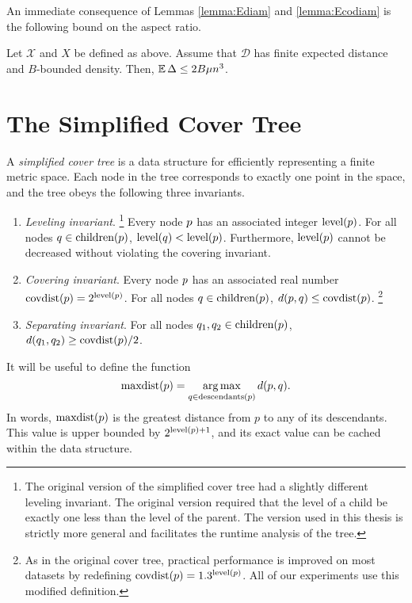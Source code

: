 \documentclass[../main.tex]{subfiles}
\newcommand{\set}[1]{\mathcal {#1}}
\newcommand{\distribution}[1]{\mathcal {#1}}
\newcommand{\dist}[2]{\distf({#1},{#2})}
\newcommand{\distf}{d}
\newcommand{\aspect}[1]{\Delta}
\newcommand{\p}{\ensuremath p}
\newcommand{\q}{\ensuremath q}
\newcommand{\mkfunction}[1]{\ifmmode{\text{{#1}}}}
\newcommand{\level}[1]      {\mkfunction{level}({#1})}
\newcommand{\children}[1]   {\mkfunction{children}({#1})}
\newcommand{\covdist}[1]    {\mkfunction{covdist}({#1})}
\newcommand{\descendants}[1]{\mkfunction{descendants}({#1})}
\newcommand{\maxdist}[1]    {\mkfunction{maxdist}({#1})}
\begin{document}
An immediate consequence of Lemmas \ref{lemma:Ediam} and \ref{lemma:Ecodiam} is the following bound on the aspect ratio.

\begin{lemma}
    \label{lemma:Easpect}
    Let $\set X$ and $X$ be defined as above.
    Assume that $\distribution D$ has finite expected distance and $B$-bounded density.
    Then, $\E\aspect{X} \le2B\mu n^3$. 
\end{lemma}


\section{The Simplified Cover Tree}

A \emph{simplified cover tree} is a data structure for efficiently representing a finite metric space.
Each node in the tree corresponds to exactly one point in the space,
and the tree obeys the following three invariants.
\begin{enumerate}
    \item \emph{Leveling invariant}.%
    \footnote{
        The original version of the simplified cover tree \citep{izbicki2015faster} had a slightly different leveling invariant.
        The original version required that the level of a child be exactly one less than the level of the parent.
        The version used in this thesis is strictly more general and facilitates the runtime analysis of the tree.
    }
    Every node $\p$ has an associated integer $\level\p$.
    For all nodes $\q\in\children\p$, $\level\q < \level\p$.
    Furthermore, $\level p$ cannot be decreased without violating the covering invariant.
    \item \emph{Covering invariant}.
    Every node $\p$ has an associated real number $\covdist\p=2^{\level\p}$.
    For all nodes $\q\in\children\p$, $\dist \p \q \le \covdist\p$.%
    \footnote{
        As in the original cover tree, practical performance is improved on most datasets by redefining $\covdist p = 1.3 ^ {\level p}$.
        All of our experiments use this modified definition.
    }
    \item \emph{Separating invariant}.
    For all nodes $\q_1,\q_2\in\children\p$, $\dist {\q_1} {\q_2} \ge \covdist\p/2$.
\end{enumerate}
It will be useful to define the function
\begin{equation}
\maxdist p = \argmax_{q\in\descendants{p}} \dist p q
.
\end{equation}
In words, $\maxdist\p$ is the greatest distance from $p$ to any of its descendants.
This value is upper bounded by $2^{\level{p}+1}$, 
and its exact value can be cached within the data structure.
\end{document}
